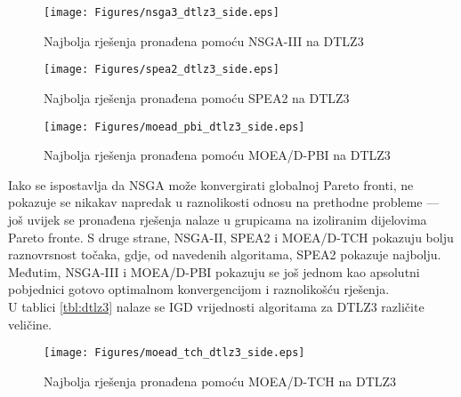\documentclass[times, utf8, zavrsni, numeric]{fer}
\begin{document}
\begin{figure}[htb]
\centering
\texttt{[image: Figures/nsga3\_dtlz3\_side.eps]}
\caption{Najbolja rješenja pronađena pomoću NSGA-III na DTLZ3}
\label{fig:nsgaiii_dtlz3}
\end{figure}

\begin{figure}[htb]
\centering
\texttt{[image: Figures/spea2\_dtlz3\_side.eps]}
\caption{Najbolja rješenja pronađena pomoću SPEA2 na DTLZ3}
\label{fig:spea2_dtlz3}
\end{figure}

\begin{figure}[htb]
\centering
\texttt{[image: Figures/moead\_pbi\_dtlz3\_side.eps]}
\caption{Najbolja rješenja pronađena pomoću MOEA/D-PBI na DTLZ3}
\label{fig:moeadpbi_dtlz3}
\end{figure}

Iako se ispostavlja da NSGA može konvergirati globalnoj Pareto fronti, ne pokazuje se nikakav napredak u raznolikosti odnosu na prethodne probleme --- još uvijek se pronađena rješenja nalaze u grupicama na izoliranim dijelovima Pareto fronte. S druge strane, NSGA-II, SPEA2 i MOEA/D-TCH pokazuju bolju raznovrsnost točaka, gdje, od navedenih algoritama, SPEA2 pokazuje najbolju. Međutim, NSGA-III i MOEA/D-PBI pokazuju se još jednom kao apsolutni pobjednici gotovo optimalnom konvergencijom i raznolikošću rješenja. \\
U tablici \ref{tbl:dtlz3} nalaze se IGD vrijednosti algoritama za DTLZ3 različite veličine.
\FloatBarrier
\begin{figure}[htb]
\centering
\texttt{[image: Figures/moead\_tch\_dtlz3\_side.eps]}
\caption{Najbolja rješenja pronađena pomoću MOEA/D-TCH na DTLZ3}
\label{fig:moeadtch_dtlz3}
\end{figure} 
\end{document}
